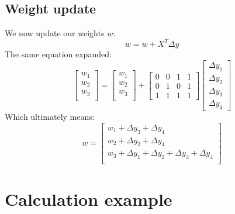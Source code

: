\documentclass[10pt,a4paper]{article}
\begin{document}
\subsection{Weight update}
We now update our weights $w$:
\begin{equation}
	w = w + X^T\Delta{y}
\end{equation}
The same equation expanded:
\begin{equation}
	\begin{bmatrix}
		w_1 \\
		w_2 \\
		w_3 \\
	\end{bmatrix}
	=
	\begin{bmatrix}
		w_1 \\
		w_2 \\
		w_3 \\
	\end{bmatrix}
	+
	\begin{bmatrix}
		0 & 0 & 1 & 1 \\
		0 & 1 & 0 & 1 \\
		1 & 1 & 1 & 1
	\end{bmatrix}
	\begin{bmatrix}
		\Delta{y_1} \\
		\Delta{y_2} \\
		\Delta{y_3} \\
		\Delta{y_4}
	\end{bmatrix}
\end{equation}
Which ultimately means:
\begin{equation}
	w =
	\begin{bmatrix}
		w_1 + \Delta{y_3} + \Delta{y_4} \\
		w_2 + \Delta{y_2} + \Delta{y_4} \\
		w_3 + \Delta{y_1} + \Delta{y_2} + \Delta{y_3} + \Delta{y_4} \\
	\end{bmatrix}
\end{equation}

\newpage

\section{Calculation example}
\end{document}
